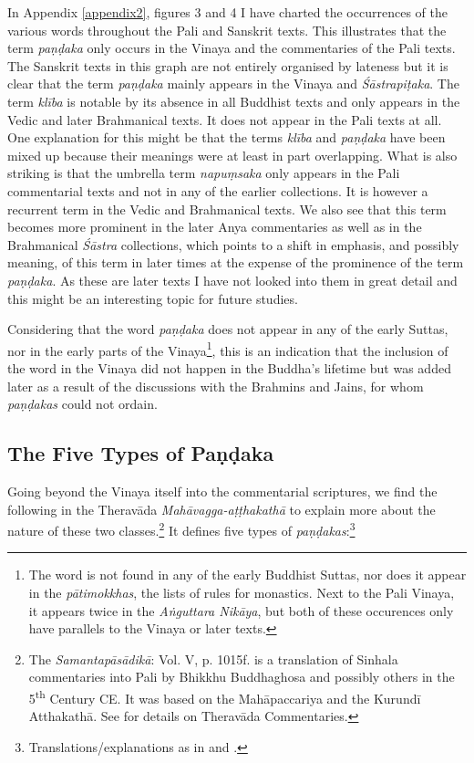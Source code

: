 In Appendix \ref{appendix2}, figures 3 and 4 I have charted the occurrences of the various words throughout the Pali and Sanskrit texts. This illustrates that the term {\em paṇḍaka} only occurs in the Vinaya and the commentaries of the Pali texts. The Sanskrit texts in this graph are not entirely organised by lateness but it is clear that the term {\em paṇḍaka} mainly appears in the Vinaya and {\em Śāstrapiṭaka}. The term {\em klība} is notable by its absence in all Buddhist texts and only appears in the Vedic and later Brahmanical texts. It does not appear in the Pali texts at all. One explanation for this might be that the terms {\em klība} and {\em paṇḍaka} have been mixed up because their meanings were at least in part overlapping. What is also striking is that the umbrella term {\em napuṃsaka} only appears in the Pali commentarial texts and not in any of the earlier collections. It is however a recurrent term in the Vedic and Brahmanical texts. We also see that this term becomes more prominent in the later Anya commentaries as well as in the Brahmanical {\em Śāstra} collections, which points to a shift in emphasis, and possibly meaning, of this term in later times at the expense of the prominence of the term {\em paṇḍaka}. As these are later texts I have not looked into them in great detail and this might be an interesting topic for future studies.

Considering that the word {\em paṇḍaka} does not appear in any of the early Suttas, nor in the early parts of the Vinaya\footnote{The word is not found in any of the early Buddhist Suttas, nor does it appear in the {\em pātimokkhas}, the lists of rules for monastics. Next to the Pali Vinaya, it appears twice in the {\em Aṅguttara Nikāya}, but both of these occurences only have parallels to the Vinaya or later texts.}, this is an indication that the inclusion of the word in the Vinaya did not happen in the Buddha's lifetime but was added later as a result of the discussions with the Brahmins and Jains, for whom {\em paṇḍakas} could not ordain.

\subsection{The Five Types of Paṇḍaka}
Going beyond the Vinaya itself into the commentarial scriptures, we find the following in the Theravāda {\em Mahāvagga-aṭṭhakathā} to explain more about the nature of these two classes.\footnote{The {\em Samantapāsādikā}: Vol. V, p. 1015f. is a translation of Sinhala commentaries into Pali by Bhikkhu Buddhaghosa and possibly others in the 5\textsuperscript{th} Century CE. It was based on the Mahāpaccariya and the Kurundī Atthakathā. See \cite{goonesekere} for details on Theravāda Commentaries.} It defines five types of {\em paṇḍakas}:\footnote{Translations/explanations as in \cite{bomhard} and \cite{thanissaro}.}


